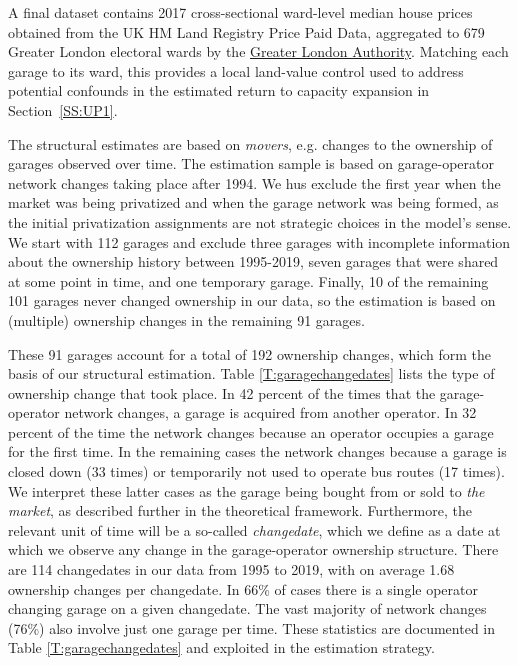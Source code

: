 \documentclass[12pt]{article}
\begin{document}
A final dataset contains 2017 cross-sectional ward-level median house prices 
obtained from the UK HM Land Registry Price Paid Data, aggregated to 679 
Greater London electoral wards by the \href{https://data.london.gov.uk/dataset/average-house-prices-by-borough-ward-msoa-and-lsoa-2jkxd/}{Greater London Authority}. Matching each garage to its ward, this 
provides a local land-value control used to address potential confounds in 
the estimated return to capacity expansion in Section~\ref{SS:UP1}.

The structural estimates are based on \emph{movers}, e.g. changes to the ownership of garages observed over time. The estimation sample is based on garage-operator network changes taking place after 1994. We hus exclude the first year when the market was being privatized and when the garage network was being formed, as the initial privatization assignments are not strategic choices in the model's sense. We start with 112 garages and exclude three garages with incomplete information about the ownership history between 1995-2019, seven garages that were shared at some point in time, and one temporary garage. Finally, 10 of the remaining 101 garages never changed ownership in our data, so the estimation is based on (multiple) ownership changes in the remaining 91 garages.

These 91 garages account for a total of 192 ownership changes, which form the basis of our structural estimation. Table \ref{T:garagechangedates} lists the type of ownership change that took place. In 42 percent of the times that the garage-operator network changes, a garage is acquired from another operator. In 32 percent of the time the network changes because an operator occupies a garage for the first time. In the remaining cases the network changes because a garage is closed down (33 times) or temporarily not used to operate bus routes (17 times). We interpret these latter cases as the garage being bought from or sold to \emph{the market}, as described further in the theoretical framework. Furthermore, the relevant unit of time will be a so-called \emph{changedate}, which we define as a date at which we observe any change in the garage-operator ownership structure. There are 114 changedates in our data from 1995 to 2019, with on average 1.68 ownership changes per changedate. In 66\% of cases there is a single operator changing garage on a given changedate. The vast majority of network changes (76\%) also involve just one garage per time. These statistics are documented in Table \ref{T:garagechangedates} and exploited in the estimation strategy. %
\end{document}
